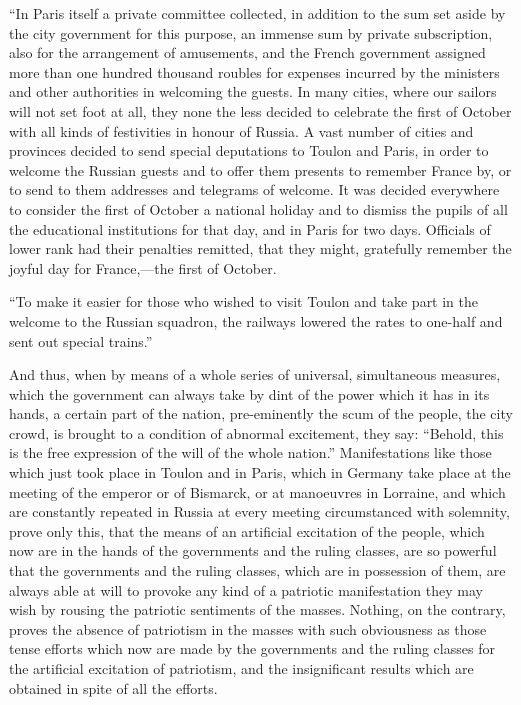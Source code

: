 \documentclass{book}
\begin{document}
“In Paris itself a private committee collected, in addition to the sum set aside by the city government for this purpose, an immense sum by private subscription, also for the arrangement of amusements, and the French government assigned more than one hundred thousand roubles for expenses incurred by the ministers and other authorities in welcoming the guests. In many cities, where our sailors will not set foot at all, they none the less decided to celebrate the first of October with all kinds of festivities in honour of Russia. A vast number of cities and provinces decided to send special deputations to Toulon and Paris, in order to welcome the Russian guests and to offer them presents to remember France by, or to send to them addresses and telegrams of welcome. It was decided everywhere to consider the first of October a national holiday and to dismiss the pupils of all the educational institutions for that day, and in Paris for two days. Officials of lower rank had their penalties remitted, that they might, gratefully remember the joyful day for France,—the first of October.

“To make it easier for those who wished to visit Toulon and take part in the welcome to the Russian squadron, the railways lowered the rates to one-half and sent out special trains.”

And thus, when by means of a whole series of universal, simultaneous measures, which the government can always take by dint of the power which it has in its hands, a certain part of the nation, pre-eminently the scum of the people, the city crowd, is brought to a condition of abnormal excitement, they say: “Behold, this is the free expression of the will of the whole nation.” Manifestations like those which just took place in Toulon and in Paris, which in Germany take place at the meeting of the emperor or of Bismarck, or at manoeuvres in Lorraine, and which are constantly repeated in Russia at every meeting circumstanced with solemnity, prove only this, that the means of an artificial excitation of the people, which now are in the hands of the governments and the ruling classes, are so powerful that the governments and the ruling classes, which are in possession of them, are always able at will to provoke any kind of a patriotic manifestation they may wish by rousing the patriotic sentiments of the masses. Nothing, on the contrary, proves the absence of patriotism in the masses with such obviousness as those tense efforts which now are made by the governments and the ruling classes for the artificial excitation of patriotism, and the insignificant results which are obtained in spite of all the efforts.
\end{document}
